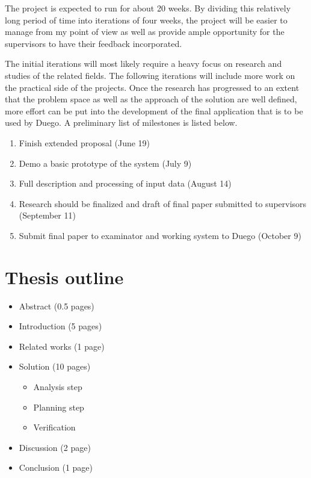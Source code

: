 \documentclass[11pt,a4paper]{report}
\begin{document}
The project is expected to run for about 20 weeks. By dividing this relatively long period of time into iterations of four weeks, the project will be easier to manage from my point of view as well as provide ample opportunity for the supervisors to have their feedback incorporated.

The initial iterations will most likely require a heavy focus on research and studies of the related fields. The following iterations will include more work on the practical side of the projects. Once the research has progressed to an extent that the problem space as well as the approach of the solution are well defined, more effort can be put into the development of the final application that is to be used by Duego. A preliminary list of milestones is listed below.

\begin{enumerate}
	\item Finish extended proposal (June 19)
	\item Demo a basic prototype of the system (July 9)
	\item Full description and processing of input data (August 14)
	\item Research should be finalized and draft of final paper submitted to supervisors (September 11)
	\item Submit final paper to examinator and working system to Duego (October 9)
\end{enumerate}

\section{Thesis outline}
\begin{itemize}
	\item Abstract (0.5 pages)
 	\item Introduction (5 pages)
 	\item Related works (1 page)
 	\item Solution (10 pages)
 	\begin{itemize}
		\item Analysis step
		\item Planning step
		\item Verification
	\end{itemize}
	\item Discussion (2 page)
	\item Conclusion (1 page)
\end{itemize}

\setspecialhdr

\newpage

\appendix
\setdefaulthdr
%
\end{document}
